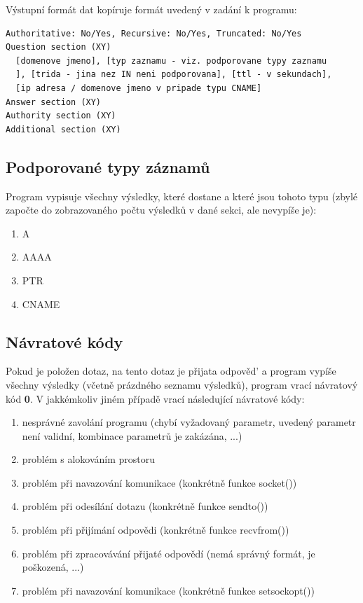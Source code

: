 \documentclass[a4paper,11pt]{article}
\begin{document}
Výstupní formát dat kopíruje formát uvedený v zadání k programu:

\begin{lstlisting}[frame=single]
Authoritative: No/Yes, Recursive: No/Yes, Truncated: No/Yes
Question section (XY)
  [domenove jmeno], [typ zaznamu - viz. podporovane typy zaznamu
  ], [trida - jina nez IN neni podporovana], [ttl - v sekundach],
  [ip adresa / domenove jmeno v pripade typu CNAME]
Answer section (XY)
Authority section (XY)
Additional section (XY)
\end{lstlisting}

\subsection{Podporované typy záznamů}

Program vypisuje všechny výsledky, které dostane a které jsou tohoto typu (zbylé započte do zobrazovaného počtu výsledků v dané sekci, ale nevypíše je):

\begin{enumerate}
\item A
\item AAAA
\item PTR
\item CNAME
\end{enumerate}

\subsection{Návratové kódy}

Pokud je položen dotaz, na tento dotaz je přijata odpověd’ a program vypíše všechny výsledky (včetně prázdného seznamu výsledků), program vrací návratový kód \textbf{0}. V jakkémkoliv jiném případě vrací následující návratové kódy:

\begin{enumerate}
\item nesprávné zavolání programu (chybí vyžadovaný parametr, uvedený parametr není validní, kombinace parametrů je zakázána, ...)
\item problém s alokováním prostoru
\item problém při navazování komunikace (konkrétně funkce socket())
\item problém při odesílání dotazu (konkrétně funkce sendto()) 
\item problém při přijímání odpovědi (konkrétně funkce recvfrom()) 
\item problém při zpracovávání přijaté odpovědí (nemá správný formát, je poškozená, ...)
\item problém při navazování komunikace (konkrétně funkce setsockopt())
\end{enumerate}
\end{document}
